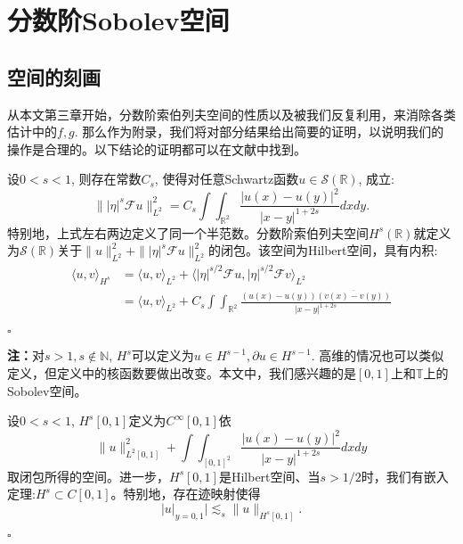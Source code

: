 ﻿
\chapter{分数阶Sobolev空间}

\section{空间的刻画}
从本文第三章开始，分数阶索伯列夫空间的性质以及被我们反复利用，来消除各类估计中的$f,g$. 那么作为附录，我们将对部分结果给出简要的证明，以说明我们的操作是合理的。以下结论的证明都可以在文献\citep{RS96}中找到。

\begin{thm}\songti\rm 设$0<s<1$, 则存在常数$C_s$, 使得对任意Schwartz函数$u\in \mathcal{S}(\mathbb{R})$, 成立:
\[
\||\eta|^s\mathcal{F}u\|_{L^2}^2=C_s\int\int_{\mathbb{R}^2}\frac{|u(x)-u(y)|^2}{|x-y|^{1+2s}}dxdy.
\]
特别地，上式左右两边定义了同一个半范数。分数阶索伯列夫空间$H^s(\mathbb{R})$就定义为$\mathcal{S}(\mathbb{R})$关于$\|u\|_{L^2}^2+\||\eta|^s\mathcal{F}u\|_{L^2}^2$的闭包。该空间为Hilbert空间，具有内积:
\[
\begin{aligned}
\langle u,v\rangle_{H^s}&=\langle u,v\rangle_{L^2}+\langle |\eta|^{s/2}\mathcal{F}u,|\eta|^{s/2}\mathcal{F}v\rangle_{L^2} \\
&=\langle u,v\rangle_{L^2}+C_s\int\int_{\mathbb{R}^2}\frac{(u(x)-u(y))\overline{(v(x)-v(y))}}{|x-y|^{1+2s}}
\end{aligned}
\]
\end{thm}
\begin{flushright}
$\square$
\end{flushright}

\textbf{注：}对$s>1,s\notin\mathbb{N}$, $H^s$可以定义为$u\in H^{s-1},\partial u\in H^{s-1}$. 高维的情况也可以类似定义，但定义中的核函数要做出改变。本文中，我们感兴趣的是$[0,1]$上和$\mathbb{T}$上的Sobolev空间。

\begin{thm}\songti\rm 设$0<s<1$, $H^s[0,1]$定义为$C^{\infty}[0,1]$依$$\|u\|_{L^2[0,1]}^2+\int\int_{[0,1]^2}\frac{|u(x)-u(y)|^2}{|x-y|^{1+2s}}dxdy$$取闭包所得的空间。进一步，$H^s[0,1]$是Hilbert空间、当$s>1/2$时，我们有嵌入定理:$H^s\subset C[0,1]$。特别地，存在迹映射使得$$|u|_{y=0,1}|\lesssim_s \|u\|_{H^s[0,1]}.$$
\end{thm}
\begin{flushright}
$\square$
\end{flushright}

